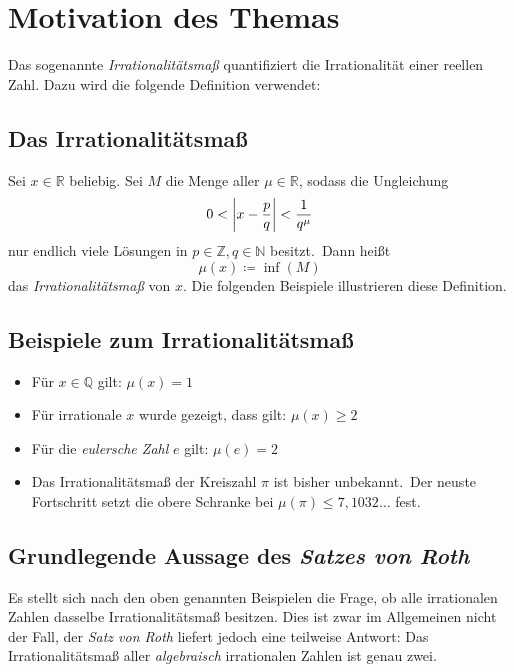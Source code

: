 
\section{Motivation des Themas}
    \label{sec:motivation}
    \textrm{Das sogenannte \emph{Irrationalitätsmaß} quantifiziert die Irrationalität einer reellen Zahl. Dazu wird
    die folgende Definition verwendet:}
    
    \subsection{\textrm{Das Irrationalitätsmaß}}
        \label{subsec:irr-measure}
        \textrm{Sei $x \in \mathbb{R}$ beliebig. Sei $M$ die Menge aller $\mu \in \mathbb{R}$, sodass die Ungleichung
            \begin{equation*}
                0 < \left| x - \frac{p}{q} \right| < \frac{1}{q^\mu}
            \end{equation*}
            nur endlich viele Lösungen in $p \in \mathbb{Z}, q \in \mathbb{N}$
            besitzt.\ Dann heißt
            \begin{equation*}
                \mu(x) \coloneqq \inf(M)
            \end{equation*}
            das \emph{Irrationalitätsmaß} von $x$.
            \newline
            Die folgenden Beispiele illustrieren diese Definition.}
    
    \subsection{\textrm{Beispiele zum Irrationalitätsmaß}}
        \label{subsec:examples-irr-measure}
        \begin{itemize}
            \item \textrm{Für $x \in \mathbb{Q}$ gilt: $\mu(x) = 1$}
            \item \textrm{Für irrationale $x$ wurde gezeigt, dass gilt: $\mu(x) \geq 2$}
            \item \textrm{Für die \emph{eulersche Zahl} $e$ gilt: $\mu(e) = 2$}
            \item \textrm{Das Irrationalitätsmaß der Kreiszahl $\pi$ ist bisher unbekannt.\ Der neuste Fortschritt
            setzt die obere Schranke bei $\mu(\pi) \leq 7,1032\dots$ fest.}
        \end{itemize}
    
    \subsection{Grundlegende Aussage des \emph{Satzes von Roth}}
        \label{subsec:basically-svr}
        \textrm{Es stellt sich nach den oben genannten Beispielen die Frage, ob alle irrationalen Zahlen dasselbe
        Irrationalitätsmaß besitzen.
        \newline
        Dies ist zwar im Allgemeinen nicht der Fall, der \emph{Satz von Roth} liefert jedoch eine teilweise Antwort:
        \newline
        Das Irrationalitätsmaß aller \emph{algebraisch} irrationalen Zahlen ist genau zwei.}
    
